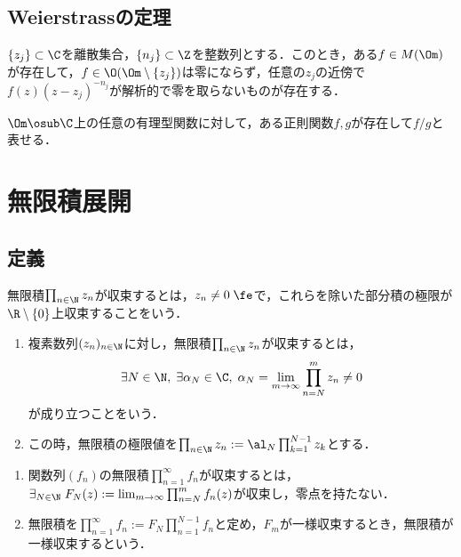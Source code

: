 \documentclass[uplatex, dvipdfmx]{jsreport}
\begin{document}
\subsection{Weierstrassの定理}

\begin{theorem}
    $\{z_j\}\subset\C$を離散集合，$\{n_j\}\subset\Z$を整数列とする．このとき，ある$f\in M(\Om)$が存在して，$f\in\O(\Om\setminus\{z_j\})$は零にならず，任意の$z_j$の近傍で$f(z)(z-z_j)^{-n_j}$が解析的で零を取らないものが存在する．
\end{theorem}

\begin{corollary}
    $\Om\osub\C$上の任意の有理型関数に対して，ある正則関数$f,g$が存在して$f/g$と表せる．
\end{corollary}


\section{無限積展開}

\subsection{定義}

\begin{tcolorbox}[colframe=ForestGreen, colback=ForestGreen!10!white,breakable,colbacktitle=ForestGreen!40!white,coltitle=black,fonttitle=\bfseries\sffamily,
title=]
    無限積$\prod_{n\in\N}z_n$が収束するとは，$z_n\ne0\;\fe$で，これらを除いた部分積の極限が$\R\setminus\{0\}$上収束することをいう．
\end{tcolorbox}

\begin{definition}[複素数の無限積の収束]\mbox{}
    \begin{enumerate}
        \item 
    複素数列$(z_n)_{n\in\N}$に対し，無限積$\prod_{n\in\N}z_n$が収束するとは，
    \[\exists N\in\N,\;\exists \alpha_N\in\C,\;\alpha_N=\lim_{m\to\infty}\prod_{n=N}^mz_n\ne 0\]
    が成り立つことをいう．
        \item この時，無限積の極限値を$\prod_{n\in\N}z_n:=\al_N\prod^{N-1}_{k=1}z_k$とする．
    \end{enumerate}
\end{definition}

\begin{definition}[関数列の無限積の収束]\mbox{}
    \begin{enumerate}
        \item 関数列$(f_n)$の無限積$\prod^\infty_{n=1}f_n$が収束するとは，$\exists_{N\in\N}\;F_N(z):=\lim_{m\to\infty}\prod^m_{n=N}f_n(z)$が収束し，零点を持たない．
        \item 無限積を$\prod^\infty_{n=1}f_n:=F_N\prod^{N-1}_{n=1}f_n$と定め，$F_m$が一様収束するとき，無限積が一様収束するという．
    \end{enumerate}
\end{definition}
\end{document}
